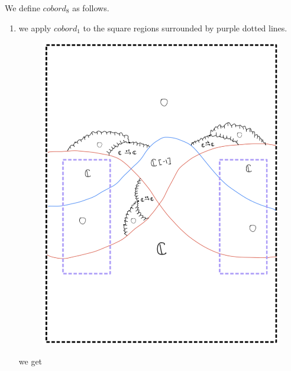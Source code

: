 We define $cobord_8$ as follows.
\begin{enumerate}[label=(Step \arabic*)]
\item we apply $cobord_1$ to the square regions surrounded by purple dotted lines.

\begin{figure}[H]
    \centering
    \includegraphics[scale = 0.95]{diagrams/cobord8/2.png}
    \caption{}
    \label{fig:your-label}
\end{figure}

we get


\end{enumerate}
